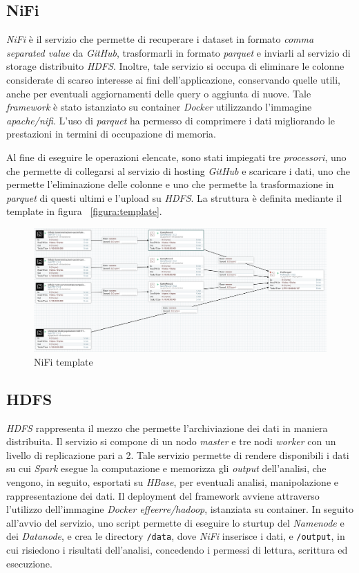 \documentclass[conference]{IEEEtran}
\begin{document}
\subsection*{\textbf{NiFi}}
\emph{NiFi} \`{e} il servizio che permette di recuperare i dataset in formato \emph{comma separated value} da \emph{GitHub}, trasformarli in formato \emph{parquet} e inviarli al servizio di storage distribuito \emph{HDFS}. Inoltre, tale servizio si occupa di eliminare le colonne considerate di scarso interesse ai fini dell'applicazione, conservando quelle utili, anche per eventuali aggiornamenti delle query o aggiunta di nuove. Tale \emph{framework} \`{e} stato istanziato su container \emph{Docker} utilizzando l'immagine \emph{apache/nifi}.
L'uso di \emph{parquet} ha permesso di comprimere i dati migliorando le prestazioni in termini di occupazione di memoria.
\par Al fine di eseguire le operazioni elencate, sono stati impiegati tre \emph{processori}, uno che permette di collegarsi al servizio di hosting \emph{GitHub} e scaricare i dati, uno che permette l'eliminazione delle colonne e uno che permette la trasformazione in \emph{parquet} di questi ultimi e l'upload su \emph{HDFS}. La struttura \`{e} definita mediante il template in figura ~\ref{figura:template}.
\begin{figure}[htbp]
\includegraphics[scale=0.16]{Screenshot/Nifi.png}
\caption{NiFi template}\label{figura:template}
\label{fig}
\end{figure}

\subsection*{\textbf{HDFS}}
\emph{HDFS} rappresenta il mezzo che permette l'archiviazione dei dati in maniera distribuita. Il servizio si compone di un nodo \emph{master} e tre nodi \emph{worker} con un livello di replicazione pari a 2. Tale servizio permette di rendere disponibili i dati su cui \emph{Spark} esegue la computazione e memorizza gli \emph{output} dell'analisi, che vengono, in seguito, esportati su \emph{HBase}, per eventuali analisi, manipolazione e rappresentazione dei dati. Il deployment del framework avviene attraverso l'utilizzo dell'immagine \emph{Docker} \emph{effeerre/hadoop}, istanziata su container. In seguito all'avvio del servizio, uno script permette di eseguire lo sturtup del \emph{Namenode} e dei \emph{Datanode}, e crea le directory \texttt{/data}, dove \emph{NiFi} inserisce i dati, e \texttt{/output}, in cui risiedono i risultati dell'analisi, concedendo i permessi di lettura, scrittura ed esecuzione.
\end{document}
